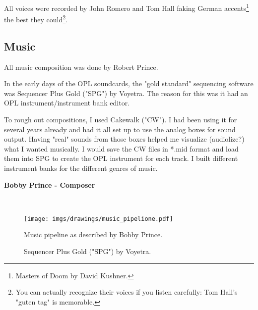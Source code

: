 \documentclass[book.tex]{subfiles}
\begin{document}
\par
All voices were recorded by John Romero and Tom Hall faking German accents\footnote{Masters of Doom by David Kushner.} the best they could\footnote{You can actually recognize their voices if you listen carefully: Tom Hall's "guten tag" is memorable.}.






\subsection{Music}
All music composition was done by Robert Prince.\\
\par
 \begin{fancyquotes}
In the early days of the OPL soundcards, the "gold standard" sequencing software was Sequencer Plus Gold ("SPG") by Voyetra. The reason for this was it had an OPL instrument/instrument bank editor.\\
\par
To rough out compositions, I used Cakewalk ("CW"). I had been using it for several years already and had it all set up to use the analog boxes for sound output. Having "real" sounds from those boxes helped me visualize (audiolize?) what I wanted musically. I would save the CW files in *.mid format and load them into SPG to create the OPL instrument for each track. I built different instrument banks for the different genres of music.\\
\par

\textbf{Bobby Prince - Composer}
 \end{fancyquotes}\\
 \par
\begin{figure}[H]
\centering

 \texttt{[image: imgs/drawings/music\_pipelione.pdf]}
 \caption{Music pipeline as described by Bobby Prince.}
\end{figure}
\par


\begin{figure}[H]
\centering
\caption{Sequencer Plus Gold ("SPG") by Voyetra.}
\end{figure}
\end{document}
